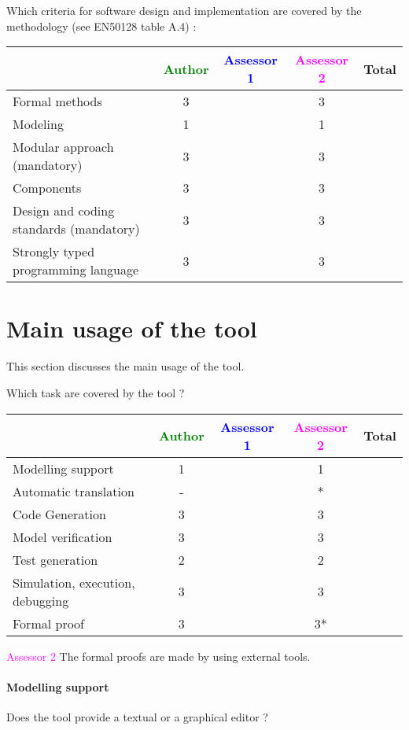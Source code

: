 Which criteria for software design and implementation are covered by the methodology
(see EN50128 table A.4) :

\begin{tabular}{|l | c | c | c | c|}
\hline
& \textcolor{green}{Author} & \textcolor{blue}{Assessor 1} & \textcolor{magenta}{Assessor 2} & Total \\
\hline
Formal methods  & 3 & & 3 &  \\
\hline 
Modeling  & 1 & & 1 &  \\
\hline
Modular approach (mandatory) & 3 & & 3 &  \\
\hline
Components & 3 & & 3 &  \\
\hline
Design and coding standards (mandatory) & 3 & & 3 &  \\
\hline
Strongly typed programming language & 3 & & 3 &  \\
\hline

\end{tabular}



\section{Main usage of the tool}
\label{main_usage}

This section discusses the main usage of the tool.

Which task are covered by the tool ?


\begin{tabular}{|l | c | c | c | c|}
\hline
& \textcolor{green}{Author} & \textcolor{blue}{Assessor 1} & \textcolor{magenta}{Assessor 2} & Total \\
\hline 
Modelling support & 1 & & 1 &  \\
\hline
Automatic translation  & - & & * & \\
\hline
Code Generation  & 3 & & 3 & \\
\hline
Model verification & 3 & & 3 & \\
\hline
Test generation & 2 & & 2 & \\
\hline
Simulation, execution, debugging & 3 & & 3 & \\
\hline
Formal proof & 3 & & 3* & \\
\hline
\end{tabular}

\textcolor{magenta}{Assessor 2} The formal proofs are made by using external
tools.

\paragraph{Modelling support}
Does the tool provide a  textual or a graphical editor ?

